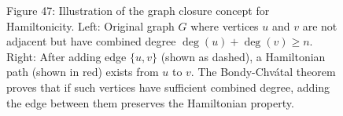 \documentclass{article}
\theoremstyle{definition}
\begin{document}
\begin{figure}[h!]

\begin{center}
\small Figure 47: Illustration of the graph closure concept for Hamiltonicity. Left: Original graph $G$ where vertices $u$ and $v$ are not adjacent but have combined degree $\deg(u) + \deg(v) \geq n$. Right: After adding edge $\{u,v\}$ (shown as dashed), a Hamiltonian path (shown in red) exists from $u$ to $v$. The Bondy-Chvátal theorem proves that if such vertices have sufficient combined degree, adding the edge between them preserves the Hamiltonian property.
\end{center}
\end{figure}
\end{document}
